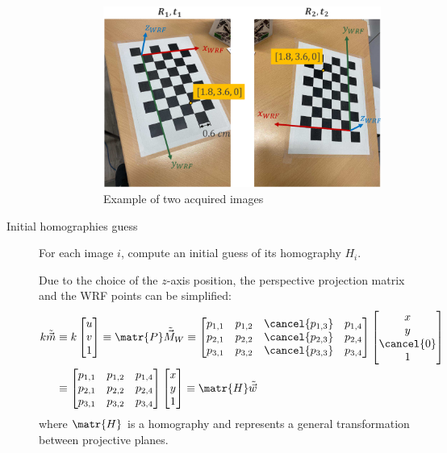 \begin{description}
\begin{description}
                \begin{figure}[H]
                    \centering
                    \includegraphics[width=0.45\linewidth]{./img/_zhang_image_acquistion.pdf}
                    \caption{Example of two acquired images}
                \end{figure}
        \end{description}

    \item[Initial homographies guess]
        For each image $i$, compute an initial guess of its homography $H_i$.

        Due to the choice of the $z$-axis position, the perspective projection matrix and the WRF points can be simplified:
        \[ 
            \begin{split}
                k \tilde{\vec{m}} &\equiv 
                k \begin{bmatrix} u \\ v \\ 1 \end{bmatrix} \equiv
                \matr{P} \tilde{\vec{M}}_W \equiv
                \begin{bmatrix}
                    p_{1,1} & p_{1,2} & \cancel{p_{1,3}} & p_{1,4} \\
                    p_{2,1} & p_{2,2} & \cancel{p_{2,3}} & p_{2,4} \\
                    p_{3,1} & p_{3,2} & \cancel{p_{3,3}} & p_{3,4}
                \end{bmatrix}
                \begin{bmatrix} x \\ y \\ \cancel{0} \\ 1 \end{bmatrix} \\
                &\equiv \begin{bmatrix}
                    p_{1,1} & p_{1,2} & p_{1,4} \\
                    p_{2,1} & p_{2,2} & p_{2,4} \\
                    p_{3,1} & p_{3,2} & p_{3,4}
                \end{bmatrix}
                \begin{bmatrix} x \\ y \\ 1 \end{bmatrix} \equiv
                \matr{H}\tilde{\vec{w}}
            \end{split}
        \]
        where $\matr{H}$ is a homography and represents a general transformation between projective planes.


\end{description}
